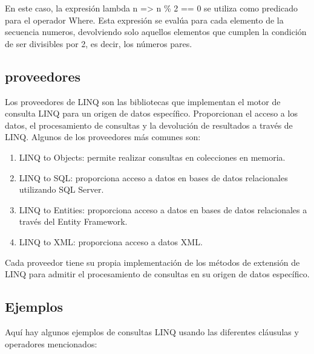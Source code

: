 \documentclass[executivepaper]{article}
\begin{document}
En este caso, la expresión lambda n => n \% 2 == 0 se utiliza como predicado para el operador Where. Esta expresión se evalúa para cada elemento de la secuencia numeros, devolviendo solo aquellos elementos que cumplen la condición de ser divisibles por 2, es decir, los números pares.

\subsection*{proveedores}

Los proveedores de LINQ son las bibliotecas que implementan el motor de consulta LINQ para un origen de datos específico. Proporcionan el acceso a los datos, el procesamiento de consultas y la devolución de resultados a través de LINQ. Algunos de los proveedores más comunes son:
\begin{enumerate}
    \item LINQ to Objects: permite realizar consultas en colecciones en memoria.
    \item LINQ to SQL: proporciona acceso a datos en bases de datos relacionales utilizando SQL Server.
    \item LINQ to Entities: proporciona acceso a datos en bases de datos relacionales a través del Entity Framework.
    \item LINQ to XML: proporciona acceso a datos XML.
\end{enumerate}
Cada proveedor tiene su propia implementación de los métodos de extensión de LINQ para admitir el procesamiento de consultas en su origen de datos específico.

\subsection{Ejemplos}

Aquí hay algunos ejemplos de consultas LINQ usando las diferentes cláusulas y operadores mencionados:
\end{document}
